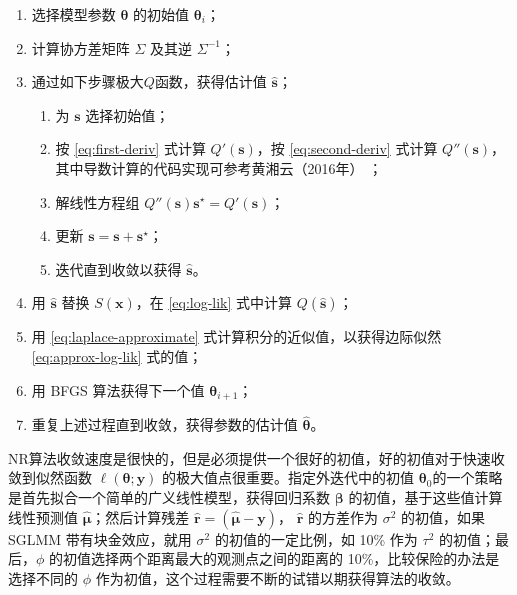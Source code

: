 \documentclass[12pt,a4paper,UTF8,twoside]{book}
\providecommand{\tightlist}{%
  \setlength{\itemsep}{0pt}\setlength{\parskip}{0pt}}
\theoremstyle{definition}
\theoremstyle{definition}
\theoremstyle{definition}
\theoremstyle{remark}
\begin{document}
\begin{enumerate}
\def\labelenumi{\arabic{enumi}.}
\tightlist
\item
  选择模型参数 \(\boldsymbol{\theta}\) 的初始值
  \(\boldsymbol{\theta}_{i}\)；
\item
  计算协方差矩阵 \(\Sigma\) 及其逆 \(\Sigma^{-1}\)；
\item
  通过如下步骤极大\(Q\)函数，获得估计值 \(\hat{\mathbf{s}}\)；

  \begin{enumerate}
  \def\labelenumii{(\alph{enumii})}
  \tightlist
  \item
    为 \(\mathbf{s}\) 选择初始值；
  \item
    按 \eqref{eq:first-deriv} 式计算 \(Q'(\mathbf{s})\)，按
    \eqref{eq:second-deriv} 式计算
    \(Q''(\mathbf{s})\)，其中导数计算的代码实现可参考黄湘云（2016年）
    \citep{Huang2016COS}；
  \item
    解线性方程组
    \(Q''(\mathbf{s})\mathbf{s}^{\star} = Q'(\mathbf{s})\)；
  \item
    更新 \(\mathbf{s = s + s^{\star}}\)；
  \item
    迭代直到收敛以获得 \(\hat{\mathbf{s}}\)。
  \end{enumerate}
\item
  用 \(\hat{\mathbf{s}}\) 替换 \(S(\mathbf{x})\)，在 \eqref{eq:log-lik}
  式中计算 \(Q(\hat{\mathbf{s}})\)；
\item
  用 \eqref{eq:laplace-approximate} 式计算积分的近似值，以获得边际似然
  \eqref{eq:approx-log-lik} 式的值；
\item
  用 BFGS 算法获得下一个值 \(\boldsymbol{\theta}_{i+1}\)；
\item
  重复上述过程直到收敛，获得参数的估计值 \(\hat{\boldsymbol{\theta}}\)。
\end{enumerate}

NR算法收敛速度是很快的，但是必须提供一个很好的初值，好的初值对于快速收敛到似然函数
\(\ell(\boldsymbol{\theta};\mathbf{y})\)
的极大值点很重要。指定外迭代中的初值
\(\boldsymbol{\theta}_{0}\)的一个策略是首先拟合一个简单的广义线性模型，获得回归系数
\(\boldsymbol{\beta}\) 的初值，基于这些值计算线性预测值
\(\hat{\boldsymbol{\mu}}\)；然后计算残差
\(\hat{\boldsymbol{r}} = (\hat{\boldsymbol{\mu}} - \mathbf{y})\)，
\(\hat{\boldsymbol{r}}\) 的方差作为 \(\sigma^2\) 的初值，如果 SGLMM
带有块金效应，就用 \(\sigma^2\) 的初值的一定比例，如 10\% 作为
\(\tau^2\) 的初值；最后，\(\phi\)
的初值选择两个距离最大的观测点之间的距离的
10\%，比较保险的办法是选择不同的 \(\phi\)
作为初值，这个过程需要不断的试错以期获得算法的收敛\citep{Bonat2016Practical}。
\end{document}
